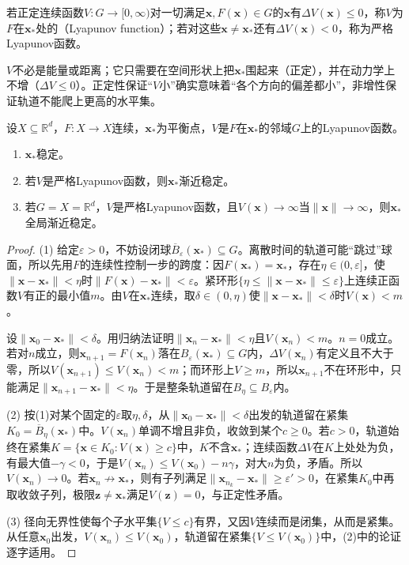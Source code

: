 \begin{definition}[离散Lyapunov函数]
\label{def:dds-lyapunov-function}
若正定连续函数$V:G\to[0,\infty)$对一切满足$\bm x,F(\bm x)\in G$的$\bm x$有$\Delta V(\bm x)\leq0$，称$V$为$F$在$\bm x_*$处的（Lyapunov function）；若对这些$\bm x\neq\bm x_*$还有$\Delta V(\bm x)<0$，称为严格Lyapunov函数。
\end{definition}

$V$不必是能量或距离；它只需要在空间形状上把$\bm x_*$围起来（正定），并在动力学上不增（$\Delta V\leq0$）。正定性保证“$V$小”确实意味着“各个方向的偏差都小”，非增性保证轨道不能爬上更高的水平集。

\begin{theorem}[离散时间Lyapunov判据]
\label{thm:dds-lyapunov-criterion}
设$X\subseteq\mathbb R^d$，$F:X\to X$连续，$\bm x_*$为平衡点，$V$是$F$在$\bm x_*$的邻域$G$上的Lyapunov函数。
\begin{enumerate}
  \item $\bm x_*$稳定。
  \item 若$V$是严格Lyapunov函数，则$\bm x_*$渐近稳定。
  \item 若$G=X=\mathbb R^d$，$V$是严格Lyapunov函数，且$V(\bm x)\to\infty$当$\lVert\bm x\rVert\to\infty$，则$\bm x_*$全局渐近稳定。
\end{enumerate}
\end{theorem}

\begin{proof}
(1) 给定$\varepsilon>0$，不妨设闭球$\overline B_\varepsilon(\bm x_*)\subseteq G$。离散时间的轨道可能“跳过”球面，所以先用$F$的连续性控制一步的跨度：因$F(\bm x_*)=\bm x_*$，存在$\eta\in(0,\varepsilon]$，使$\lVert\bm x-\bm x_*\rVert<\eta$时$\lVert F(\bm x)-\bm x_*\rVert<\varepsilon$。紧环形$\{\eta\leq\lVert\bm x-\bm x_*\rVert\leq\varepsilon\}$上连续正函数$V$有正的最小值$m$。由$V$在$\bm x_*$连续，取$\delta\in(0,\eta)$使$\lVert\bm x-\bm x_*\rVert<\delta$时$V(\bm x)<m$。

设$\lVert\bm x_0-\bm x_*\rVert<\delta$。用归纳法证明$\lVert\bm x_n-\bm x_*\rVert<\eta$且$V(\bm x_n)<m$。$n=0$成立。若对$n$成立，则$\bm x_{n+1}=F(\bm x_n)$落在$B_\varepsilon(\bm x_*)\subseteq G$内，$\Delta V(\bm x_n)$有定义且不大于零，所以$V(\bm x_{n+1})\leq V(\bm x_n)<m$；而环形上$V\geq m$，所以$\bm x_{n+1}$不在环形中，只能满足$\lVert\bm x_{n+1}-\bm x_*\rVert<\eta$。于是整条轨道留在$B_\eta\subseteq B_\varepsilon$内。

(2) 按(1)对某个固定的$\varepsilon$取$\eta,\delta$，从$\lVert\bm x_0-\bm x_*\rVert<\delta$出发的轨道留在紧集$K_0=\overline B_\eta(\bm x_*)$中。$V(\bm x_n)$单调不增且非负，收敛到某个$c\geq0$。若$c>0$，轨道始终在紧集$K=\{\bm x\in K_0:V(\bm x)\geq c\}$中，$K$不含$\bm x_*$；连续函数$\Delta V$在$K$上处处为负，有最大值$-\gamma<0$，于是$V(\bm x_n)\leq V(\bm x_0)-n\gamma$，对大$n$为负，矛盾。所以$V(\bm x_n)\to0$。若$\bm x_n\not\to\bm x_*$，则有子列满足$\lVert\bm x_{n_k}-\bm x_*\rVert\geq\varepsilon'>0$，在紧集$K_0$中再取收敛子列，极限$\bm z\neq\bm x_*$满足$V(\bm z)=0$，与正定性矛盾。

(3) 径向无界性使每个子水平集$\{V\leq c\}$有界，又因$V$连续而是闭集，从而是紧集。从任意$\bm x_0$出发，$V(\bm x_n)\leq V(\bm x_0)$，轨道留在紧集$\{V\leq V(\bm x_0)\}$中，(2)中的论证逐字适用。
\end{proof}

